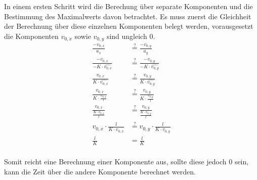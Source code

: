 In einem ersten Schritt wird die Berechung über separate Komponenten und die Bestimmung des Maximalwerts davon
betrachtet. Es muss zuerst die Gleichheit der Berechnung über diese einzelnen Komponenten belegt werden, vorausgesetzt
die Komponenten $v_{0,x}$ sowie $v_{0,y}$ sind ungleich $0$.
\begin{align}
    \frac{-v_{0,x}}{a_x} &\stackrel{?}{=} \frac{-v_{0,y}}{a_y}\\
    \frac{-v_{0,x}}{-K \cdot \hat{v_{0,x}}} &\stackrel{?}{=} \frac{-v_{0,y}}{-K \cdot \hat{v_{0,y}}}\\
    \frac{v_{0,x}}{K \cdot \hat{v_{0,x}}} &\stackrel{?}{=} \frac{v_{0,y}}{K \cdot \hat{v_{0,y}}}\\
    \frac{v_{0,x}}{K \cdot \frac{v_{0,x}}{l}} &\stackrel{?}{=} \frac{v_{0,y}}{K \cdot \frac{v_{0,y}}{l}}\\
    \frac{v_{0,x}}{\frac{K \cdot v_{0,x}}{l}} &\stackrel{?}{=} \frac{v_{0,y}}{\frac{K \cdot v_{0,y}}{l}}\\
    v_{0,x} \cdot \frac{l}{K \cdot v_{0,x}} &\stackrel{?}{=} v_{0,y} \cdot \frac{l}{K \cdot v_{0,y}}\\
    \frac{l}{K} &= \frac{l}{K}\\
\end{align}

Somit reicht eine Berechnung einer Komponente aus, sollte diese jedoch $0$ sein, kann die Zeit über die andere
Komponente berechnet werden.

